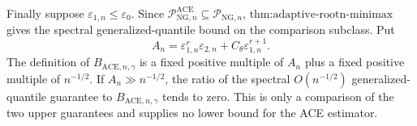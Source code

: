Finally suppose \(\varepsilon_{1,n}\le\varepsilon_0\).  Since \(\mathcal P_{\mathrm{NG},n}^{\mathrm{ACE}}\subseteq\mathcal P_{\mathrm{NG},n}\), \(\text{thm:adaptive-rootn-minimax}\) gives the spectral generalized-quantile bound on the comparison subclass.  Put
\[
 A_n=\varepsilon_{1,n}^r\varepsilon_{2,n}
     +C_\theta\varepsilon_{1,n}^{r+1}.
\]
The definition of \(B_{\mathrm{ACE},n,\gamma}\) is a fixed positive multiple of \(A_n\) plus a fixed positive multiple of \(n^{-1/2}\).  If \(A_n\gg n^{-1/2}\), the ratio of the spectral \(O(n^{-1/2})\) generalized-quantile guarantee to \(B_{\mathrm{ACE},n,\gamma}\) tends to zero.  This is only a comparison of the two upper guarantees and supplies no lower bound for the ACE estimator.